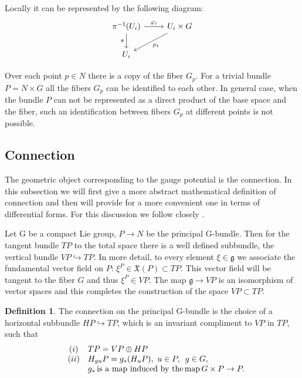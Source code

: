 \documentclass[11pt]{report}
\theoremstyle{plain}
\theoremstyle{definition}
\newtheorem{defn}[thm]{Definition}
\theoremstyle{remark}
\theoremstyle{remark}
\numberwithin{equation}{section}
\begin{document}
Locally it can be represented by the following diagram:
 \[
\begin{tikzcd}
\pi^{-1}(U_i) \arrow{r}{\varphi_i} \arrow[swap]{d}{\pi} & U_i\times G \arrow{dl}{p_1} \\
U_i
\end{tikzcd}
\]

Over each point $p\in N$ there is a copy of the fiber $G_p$. For a trivial bundle $P = N\times G$ all the fibers $G_p$ can be identified to each other. In general case, when the bundle $P$ can not be represented as a direct product of the base space and the fiber, such an identification between fibers $G_p$ at different points is not possible. 


\subsection{Connection}
The geometric object corresponding to the gauge potential is the connection. In this subsection we will first give a more abstract mathematical definition of connection and then will provide for a more convenient one in terms of differential forms. For this discussion we follow closely \cite{Nakahara}.

Let G be a compact Lie group, $P\to N$ be the principal G-bundle. Then for the tangent bundle $TP$ to the total space there is a well defined subbundle, the vertical bundle $VP\hookrightarrow TP$. In more detail,  to every element $\xi \in \mathfrak{g}$ we associate the fundamental vector field on $P$: $\xi^P \in \mathfrak{X}(P) \subset TP$. This vector field will be tangent to the fiber $G$ and thus $\xi^P \in VP$. The map $\mathfrak{g} \to VP$ is an isomorphism of vector spaces and this completes the construction of the space $VP \subset TP$. 

\begin{defn}\label{hor}
The connection on the principal G-bundle is the choice of a horizontal subbundle $HP \hookrightarrow TP$, which is an invariant compliment to $VP$ in $TP$, such that 
\[\begin{array}{lcl}
 &(i)  & TP = VP \oplus HP\\
 & (ii) & H_{gu}P = g_*(H_uP), \, \,  u\in P, \,\, \,  g\in G,\\
 & \,& g_* \, {\rm is \,  \, a  \, \, map \, \, induced \, \, by \, \,  the \, map} \, G \times P \to P.\\
 
 \end{array}\]
\end{defn}
\end{document}
